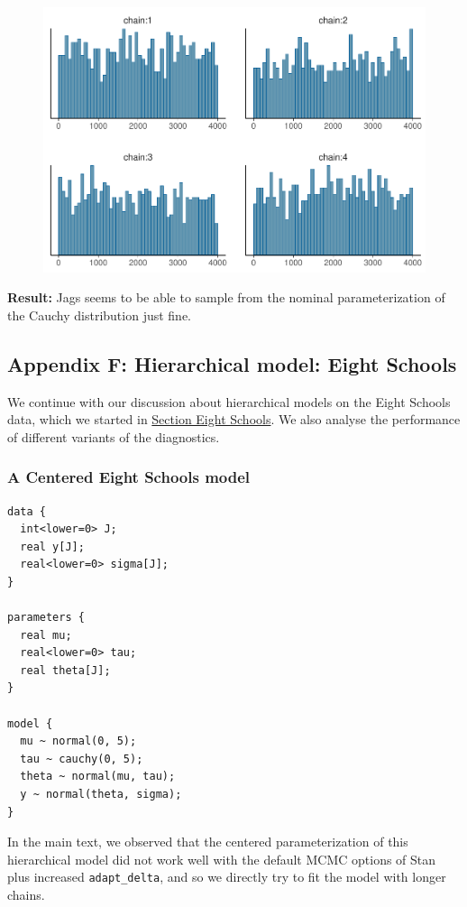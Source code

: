 \documentclass[american,]{article}
\begin{document}
\begin{figure}[tp]
  \centering
  \includegraphics[width=0.6\linewidth]{graphics/hist-jags-nom-1.pdf}
\end{figure}

\textbf{Result:} Jags seems to be able to sample from the nominal
parameterization of the Cauchy distribution just fine.

\hypertarget{AppendixF}{%
\subsection*{Appendix F: Hierarchical model: Eight
Schools}\label{AppendixF}}

We continue with our discussion about hierarchical models on the Eight
Schools data, which we started in
\protect\hyperlink{eightschools}{Section Eight Schools}. We also analyse
the performance of different variants of the diagnostics.

\hypertarget{a-centered-eight-schools-model-1}{%
\subsubsection*{A Centered Eight Schools
model}\label{a-centered-eight-schools-model-1}}

\begin{verbatim}
data {
  int<lower=0> J;
  real y[J];
  real<lower=0> sigma[J];
}

parameters {
  real mu;
  real<lower=0> tau;
  real theta[J];
}

model {
  mu ~ normal(0, 5);
  tau ~ cauchy(0, 5);
  theta ~ normal(mu, tau);
  y ~ normal(theta, sigma);
}
\end{verbatim}

In the main text, we observed that the centered parameterization of this
hierarchical model did not work well with the default MCMC options of
Stan plus increased \texttt{adapt\_delta}, and so we directly try to fit
the model with longer chains.
\end{document}
